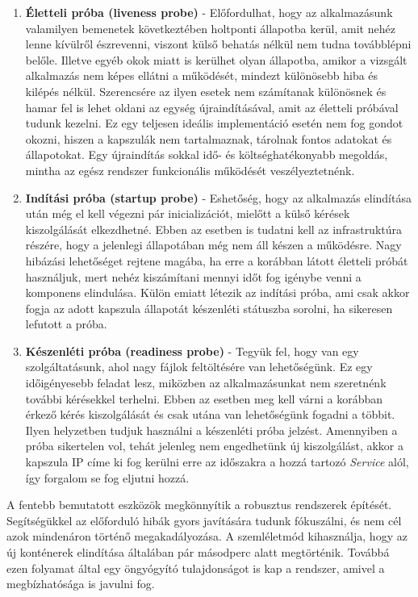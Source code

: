 \begin{enumerate}
    \item \textbf{Életteli próba (liveness probe)} - Előfordulhat, hogy az alkalmazásunk valamilyen bemenetek következtében holtponti állapotba kerül, amit nehéz lenne kívülről észrevenni, viszont külső behatás nélkül nem tudna továbblépni belőle. 
    Illetve egyéb okok miatt is kerülhet olyan állapotba, amikor a vizsgált alkalmazás nem képes ellátni a működését, mindezt különösebb hiba és kilépés nélkül.
    Szerencsére az ilyen esetek nem számítanak különösnek és hamar fel is lehet oldani az egység újraindításával, amit az életteli próbával tudunk kezelni.
    Ez egy teljesen ideális implementáció esetén nem fog gondot okozni, hiszen a kapszulák nem tartalmaznak, tárolnak fontos adatokat és állapotokat.
    Egy újraindítás sokkal idő- és költséghatékonyabb megoldás, mintha az egész rendszer funkcionális működését veszélyeztetnénk.

    \item \textbf{Indítási próba (startup probe)} - Eshetőség, hogy az alkalmazás elindítása után még el kell végezni pár inicializációt, mielőtt a külső kérések kiszolgálását elkezdhetné.
    Ebben az esetben is tudatni kell az infrastruktúra részére, hogy a jelenlegi állapotában még nem áll készen a működésre.
    Nagy hibázási lehetőséget rejtene magába, ha erre a korábban látott  életteli próbát használjuk, mert nehéz kiszámítani mennyi időt fog igénybe venni a komponens elindulása.
    Külön emiatt létezik az indítási próba, ami csak akkor fogja az adott kapszula állapotát készenléti státuszba sorolni, ha sikeresen lefutott a próba.

    \item \textbf{Készenléti próba (readiness probe)} - Tegyük fel, hogy van egy szolgáltatásunk, ahol nagy fájlok feltöltésére van lehetőségünk.
    Ez egy időigényesebb feladat lesz, miközben az alkalmazásunkat nem szeretnénk további kérésekkel terhelni.
    Ebben az esetben meg kell várni a korábban érkező kérés kiszolgálását és csak utána van lehetőségünk fogadni a többit.
    Ilyen helyzetben tudjuk használni a készenléti próba jelzést. 
    Amennyiben a próba sikertelen vol, tehát jelenleg nem engedhetünk új kiszolgálást, akkor a kapszula IP címe ki fog kerülni erre az időszakra a hozzá tartozó \textit{Service} alól, így forgalom se fog eljutni hozzá. 
    
\end{enumerate}

A fentebb bemutatott eszközök megkönnyítik a robusztus rendszerek építését.
Segítségükkel az előforduló hibák gyors javítására tudunk fókuszálni, és nem cél azok mindenáron történő megakadályozása.
A szemléletmód kihasználja, hogy az új konténerek elindítása általában pár másodperc alatt megtörténik.
Továbbá ezen folyamat által egy öngyógyító tulajdonságot is kap a rendszer, amivel a megbízhatósága is javulni fog. 

